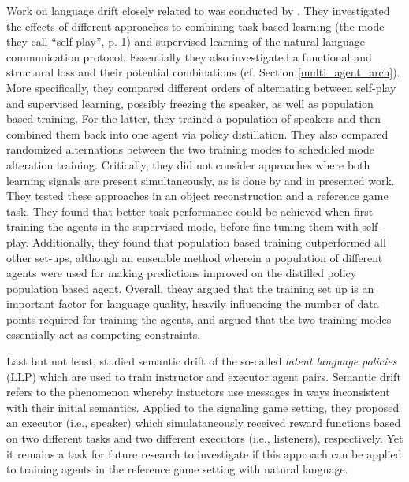 Work on language drift closely related to \cite{lazaridou2020multi} was conducted by \cite{lowe2020interaction}. They investigated the effects of different approaches to combining task based learning (the mode they call ``self-play'', p. 1) and supervised learning of the natural language communication protocol. Essentially they also investigated a functional and structural loss and their potential combinations (cf. Section \ref{multi_agent_arch}). %
More specifically, they compared different orders of alternating between self-play and supervised learning, possibly freezing the speaker, as well as population based training. For the latter, they trained a population of speakers and then combined them back into one agent via policy distillation. They also compared randomized alternations between the two training modes to scheduled mode alteration training. 
Critically, they did not consider approaches where both learning signals are present simultaneously, as is done by \cite{lazaridou2020multi} and in presented work. They tested these approaches in an object reconstruction and a reference game task.
They found that better task performance could be achieved when first training the agents in the supervised mode, before fine-tuning them with self-play. Additionally, they found that population based training outperformed all other set-ups, although an ensemble method wherein a population of different agents were used for making predictions improved on the distilled policy population based agent. Overall, theay argued that the training set up is an important factor for language quality, heavily influencing the number of data points required for training the agents, and argued that the two training modes essentially act as competing constraints. %

Last but not least, \cite{jacob2021multitasking} studied semantic drift of the so-called \textit{latent language policies} (LLP) which are used to train instructor and executor agent pairs. Semantic drift refers to the phenomenon whereby instuctors use messages in ways inconsistent with their initial semantics. Applied to the signaling game setting, they proposed an executor (i.e., speaker) which simulataneously received reward functions based on two different tasks and two different executors (i.e., listeners), respectively. Yet it remains a task for future research to investigate if this approach can be applied to training agents in the reference game setting with natural language.

